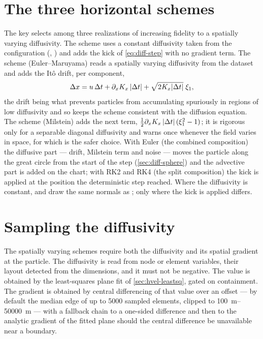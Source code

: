 
\section{The three horizontal schemes}\label{sec:diff-schemes}

The key  selects among three realizations of increasing fidelity to a spatially
varying diffusivity. The  scheme uses a constant diffusivity taken from the configuration
(, ) and adds the kick of \cref{eq:diff-step} with no gradient term.
The  scheme (Euler--Maruyama) reads a spatially varying diffusivity from the dataset and adds the
Itô drift, per component,
\begin{equation}\label{eq:diff-em}
  \Delta x = u\,\Delta t+\partial_x K_x\,\lvert\Delta t\rvert + \sqrt{2K_x\lvert\Delta t\rvert}\;\xi_1 ,
\end{equation}
the drift being what prevents particles from accumulating spuriously in regions of low diffusivity and so
keeps the scheme consistent with the diffusion equation. The  scheme (Milstein) adds the next
term, $\tfrac12\partial_x K_x\,\lvert\Delta t\rvert\,(\xi_1^2-1)$; it is rigorous only for a separable diagonal
diffusivity and warns once whenever the field varies in space, for which  is the safer
choice. With Euler (the combined composition) the diffusive part --- drift, Milstein term and noise ---
moves the particle along the great circle from the start of the step (\cref{sec:diff-sphere}) and the
advective part is added on the chart; with RK2 and RK4 (the split composition) the kick is applied at the
position the deterministic step reached. Where the diffusivity is constant,  and  draw
the same normals as ; only where the kick is applied differs.

\section{Sampling the diffusivity}\label{sec:diff-sampling}

The spatially varying schemes require both the diffusivity and its spatial gradient at the particle. The
diffusivity is read from node or element variables, their layout detected from the dimensions, and it must
not be negative. The value is obtained by the least-squares plane fit of \cref{sec:hvel-leastsq}, gated on
containment. The gradient is obtained by central differencing of that value over an offset
 --- by default the median edge of up to \num{5000} sampled elements, clipped to
\SIrange{100}{50000}{\metre} --- with a fallback chain to a one-sided difference and then to the analytic
gradient of the fitted plane should the central difference be unavailable near a boundary.

